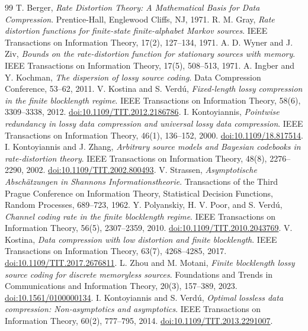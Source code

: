 \documentclass[11pt,letterpaper]{article}
\theoremstyle{definition}
\begin{document}
\begin{thebibliography}{99}\small
{} T. Berger, \emph{Rate Distortion Theory: A Mathematical Basis for Data Compression}. Prentice-Hall, Englewood Cliffs, NJ, 1971.
 R. M. Gray, \emph{Rate distortion functions for finite-state finite-alphabet Markov sources}. IEEE Transactions on Information Theory, 17(2), 127--134, 1971.
 A. D. Wyner and J. Ziv, \emph{Bounds on the rate-distortion function for stationary sources with memory}. IEEE Transactions on Information Theory, 17(5), 508--513, 1971.
 A. Ingber and Y. Kochman, \emph{The dispersion of lossy source coding}. Data Compression Conference, 53--62, 2011.
 V. Kostina and S. Verd\'u, \emph{Fixed-length lossy compression in the finite blocklength regime}. IEEE Transactions on Information Theory, 58(6), 3309--3338, 2012. \href{https://doi.org/10.1109/TIT.2012.2186786}{doi:10.1109/TIT.2012.2186786}.
 I. Kontoyiannis, \emph{Pointwise redundancy in lossy data compression and universal lossy data compression}. IEEE Transactions on Information Theory, 46(1), 136--152, 2000. \href{https://doi.org/10.1109/18.817514}{doi:10.1109/18.817514}.
 I. Kontoyiannis and J. Zhang, \emph{Arbitrary source models and Bayesian codebooks in rate-distortion theory}. IEEE Transactions on Information Theory, 48(8), 2276--2290, 2002. \href{https://doi.org/10.1109/TIT.2002.800493}{doi:10.1109/TIT.2002.800493}.
 V. Strassen, \emph{Asymptotische Absch\"atzungen in Shannons Informationstheorie}. Transactions of the Third Prague Conference on Information Theory, Statistical Decision Functions, Random Processes, 689--723, 1962.
 Y. Polyanskiy, H. V. Poor, and S. Verd\'u, \emph{Channel coding rate in the finite blocklength regime}. IEEE Transactions on Information Theory, 56(5), 2307--2359, 2010. \href{https://doi.org/10.1109/TIT.2010.2043769}{doi:10.1109/TIT.2010.2043769}.
 V. Kostina, \emph{Data compression with low distortion and finite blocklength}. IEEE Transactions on Information Theory, 63(7), 4268--4285, 2017. \href{https://doi.org/10.1109/TIT.2017.2676811}{doi:10.1109/TIT.2017.2676811}.
 L. Zhou and M. Motani, \emph{Finite blocklength lossy source coding for discrete memoryless sources}. Foundations and Trends in Communications and Information Theory, 20(3), 157--389, 2023. \href{https://doi.org/10.1561/0100000134}{doi:10.1561/0100000134}.
 I. Kontoyiannis and S. Verd\'u, \emph{Optimal lossless data compression: Non-asymptotics and asymptotics}. IEEE Transactions on Information Theory, 60(2), 777--795, 2014. \href{https://doi.org/10.1109/TIT.2013.2291007}{doi:10.1109/TIT.2013.2291007}.

\end{thebibliography}
\end{document}
